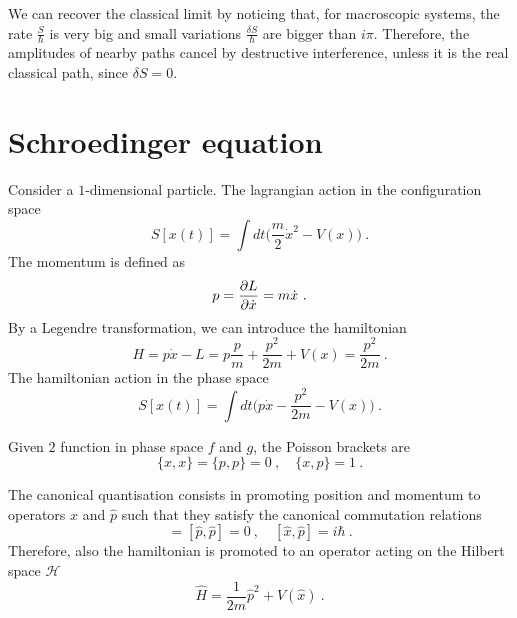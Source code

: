     We can recover the classical limit by noticing that, for macroscopic systems, the rate $\frac{S}{\hbar}$ is very big and small variations $\frac{\delta S}{\hbar}$ are bigger than $i \pi$. Therefore, the amplitudes of nearby paths cancel by destructive interference, unless it is the real classical path, since $\delta S = 0$. 

\section{Schroedinger equation}

    Consider a $1$-dimensional particle. The lagrangian action in the configuration space 
    \begin{equation*}
        S[x(t)] = \int dt \Big ( \frac{m}{2} \dot x^2 - V(x)) ~. 
    \end{equation*}
    The momentum is defined as 
    \begin{equation*}
        p = \frac{\partial L}{\partial\dot x} = m \dot x ~.
    \end{equation*}
    By a Legendre transformation, we can introduce the hamiltonian 
    \begin{equation*}
        H = p \dot x - L = p \frac{p}{m} + \frac{p^2}{2m} + V(x) = \frac{p^2}{2m} ~.
    \end{equation*}
    The hamiltonian action in the phase space 
    \begin{equation*}
        S[x(t)] = \int dt \Big ( p \dot x - \frac{p^2}{2m} - V(x)) ~. 
    \end{equation*}

    Given $2$ function in phase space $f$ and $g$, the Poisson brackets are 
    \begin{equation*}
        \{x,x\} = \{p,p\} = 0 ~, \quad \{x,p\} = 1 ~.
    \end{equation*}

    The canonical quantisation consists in promoting position and momentum to operators $\hat x$ and $\hat p$ such that they satisfy the canonical commutation relations 
    \begin{equation*}
        [\hat x, \hat x] = [\hat p, \hat p] = 0 ~, \quad [\hat x, \hat p] = i \hbar ~.
    \end{equation*}
    Therefore, also the hamiltonian is promoted to an operator acting on the Hilbert space $\mathcal H$ 
    \begin{equation*}
        \hat H = \frac{1}{2m} \hat p^2 + V(\hat x) ~.
    \end{equation*}

